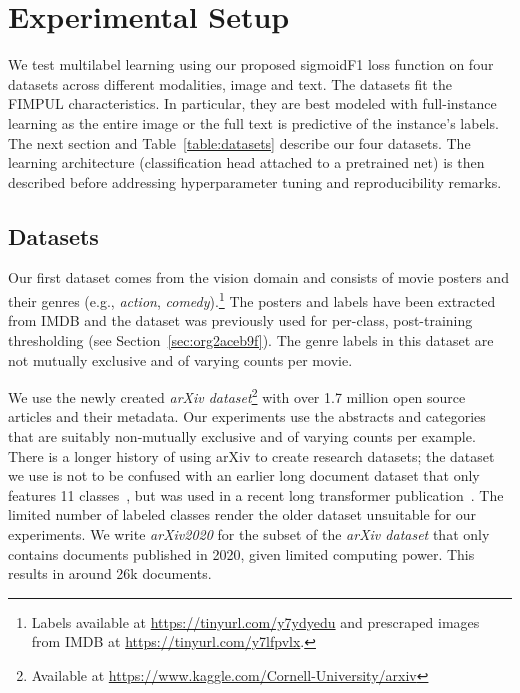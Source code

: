 
\section{Experimental Setup}
\label{sec:orgb44ba25}

We test multilabel learning using our proposed sigmoidF1 loss function on four datasets across different modalities, image and text. 
The datasets fit the FIMPUL characteristics. In particular, they are best modeled with full-instance learning as the entire image or the full text is predictive of the instance's labels. The next section and Table~\ref{table:datasets} describe our four datasets. The learning architecture (classification head attached to a pretrained net) is then described before addressing hyperparameter tuning and reproducibility remarks.

\subsection{Datasets}

Our first dataset comes from the vision domain and consists of movie posters and their genres (e.g., \emph{action}, \emph{comedy}).\footnote{Labels available at \url{https://tinyurl.com/y7ydyedu} and prescraped images from IMDB at \url{https://tinyurl.com/y7lfpvlx}.} The posters and labels have been extracted from IMDB and the dataset was previously used for per-class, post-training thresholding \citep{moviePosters} (see Section~\ref{sec:org2aceb9f}). The genre labels in this dataset are not mutually exclusive and of varying counts per movie. 

We use the newly created \emph{arXiv dataset}\footnote{Available at \url{https://www.kaggle.com/Cornell-University/arxiv}} with over 1.7 million open source articles and their metadata. Our experiments use the abstracts and categories that are suitably non-mutually exclusive and of varying counts per example. There is a longer history of using arXiv to create research datasets; the dataset we use is not to be confused with an earlier long document dataset that only features 11 classes~\citep{oldarXiv}, but was used in a recent long transformer publication~\cite{bigBird}. The limited number of labeled classes render the older dataset unsuitable for our experiments.  We write \textit{arXiv2020} for the subset of the \emph{arXiv dataset} that only contains documents published in 2020, given limited computing power. This results in around 26k documents.

